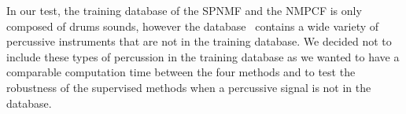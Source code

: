 In our test, the training database of the SPNMF and the NMPCF is only composed of drums sounds, however the database~\cite{bittner2014medleydb} contains a wide variety of percussive instruments that are not in the training database. We decided not to include these types of percussion in the training database as we wanted to have a comparable computation time between the four methods and to test the robustness of the supervised methods when a percussive signal is not in the database. 

